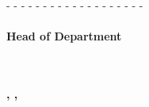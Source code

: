 \vspace{1.6cm}

\setlength{\leftskip}{5.4cm}
- - - - - - - - - - - - - - - - - - - \\
\textbf{\hod\\
Head of Department}\\
\depart\\
\clz\\
\tu

\setlength{\leftskip}{0pt}

\begin{center}\textbf{\the\day, \uppermonth, \the\year}\end{center}

